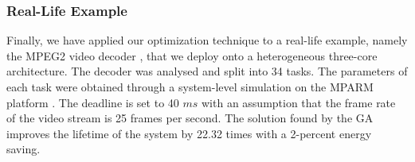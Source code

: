 \subsubsection{Real-Life Example}
Finally, we have applied our optimization technique to a real-life example, namely the MPEG2 video decoder \cite{ffmpeg2011}, that we deploy onto a heterogeneous three-core architecture. The decoder was analysed and split into 34 tasks. The parameters of each task were obtained through a system-level simulation on the MPARM platform \cite{benini2005}. The deadline is set to 40 $ms$ with an assumption that the frame rate of the video stream is 25 frames per second. The solution found by the GA improves the lifetime of the system by 22.32 times with a 2-percent energy saving.
